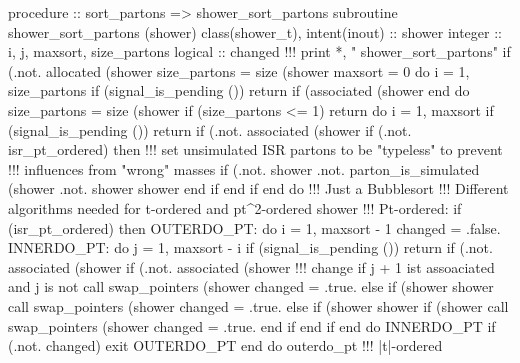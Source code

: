 \eatline
\nwendcode{}\nwdocspar
\nwenddocs{}\plusendmoddef
  procedure :: sort_partons => shower_sort_partons
\nwendcode{}\plusendmoddef
  subroutine shower_sort_partons (shower)
    class(shower_t), intent(inout) :: shower
    integer :: i, j, maxsort, size_partons
    logical :: changed
    !!! print *, " shower_sort_partons"
    if (.not. allocated (shower%
    size_partons = size (shower%
    maxsort = 0
    do i = 1, size_partons
       if (signal_is_pending ()) return
       if (associated (shower%
    end do
    size_partons = size (shower%
    if (size_partons <= 1) return
    do i = 1, maxsort
       if (signal_is_pending ()) return
       if (.not. associated (shower%
       if (.not. isr_pt_ordered) then
          !!! set unsimulated ISR partons to be "typeless" to prevent
          !!!     influences from "wrong" masses
          if (.not. shower%
              .not. parton_is_simulated (shower%
              .not. shower%
             shower%
          end if
       end if
    end do
    !!! Just a Bubblesort
    !!! Different algorithms needed for t-ordered and pt^2-ordered shower
    !!! Pt-ordered:
    if (isr_pt_ordered) then
       OUTERDO_PT: do i = 1, maxsort - 1
          changed = .false.
          INNERDO_PT: do j = 1, maxsort - i
             if (signal_is_pending ()) return
             if (.not. associated (shower%
             if (.not. associated (shower%
                !!! change if j + 1 ist assoaciated and j is not
                call swap_pointers (shower%
                changed = .true.
             else if (shower%
                  shower%
                call swap_pointers (shower%
                changed = .true.
             else if (shower%
                  shower%
                if (shower%
                   call swap_pointers (shower%
                   changed = .true.
                end if
             end if
          end do INNERDO_PT
          if (.not. changed) exit OUTERDO_PT
       end do outerdo_pt
    !!! |t|-ordered
